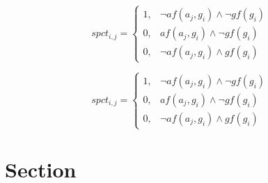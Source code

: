 \documentclass[a4paper]{article}
\begin{document}
\begin{equation}
spct_{i,j} =
\begin{cases}
1, & \text{$\neg af(a_j,g_i) \wedge \neg gf(g_i)$}\\
0, & \text{$af(a_j,g_i) \wedge \neg gf(g_i)$}\\
0, & \text{$\neg af(a_j,g_i) \wedge gf(g_i)$}
\end{cases}
\end{equation}

\begin{equation}
spct_{i,j} =
\begin{cases}
1, & \text{$\neg af(a_j,g_i) \wedge \neg gf(g_i)$}\\
0, & \text{$af(a_j,g_i) \wedge \neg gf(g_i)$}\\
0, & \text{$\neg af(a_j,g_i) \wedge gf(g_i)$}
\end{cases}
\end{equation}

\section{Section}
\end{document}
